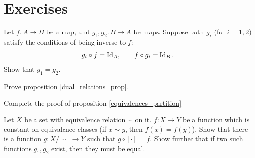 \section*{Exercises}
\begin{exercise}\label{unique_inverse}
    Let $f \colon A \to B$ be a map, and $g_1, g_2 \colon B \to A$ be maps. Suppose both $g_i$ (for $i = 1,2$) satisfy the conditions of being inverse to $f$:
    \begin{equation*}
        g_i \circ f = \operatorname{Id}_A, \quad\quad f \circ g_i = \operatorname{Id}_B.
    \end{equation*}
    Show that $g_1 = g_2$.
\end{exercise}
\begin{exercise}\label{dual_relations_exercise}
    Prove proposition \ref{dual_relations_prop}.
\end{exercise}
\begin{exercise}\label{partitions_equivalence_exercise}
    Complete the proof of proposition \ref{equivalences_partition}
\end{exercise}
\begin{exercise}
    Let $X$ be a set with equivalence relation $\sim$ on it. $f \colon X \to Y$ be a function which is constant on equivalence classes (if $x \sim y$, then $f(x) = f(y)$). Show that there is a function $g \colon X/\sim \;\to Y$ such that $g \circ [\cdot] = f$. Show further that if two such functions $g_1, g_2$ exist, then they must be equal.
\end{exercise}